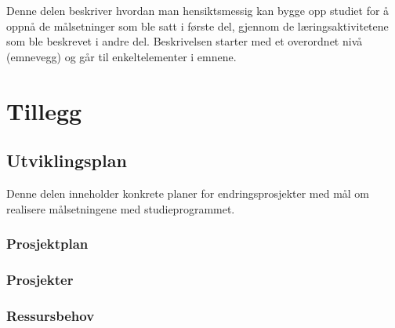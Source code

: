\documentclass[a4paper, oneside, 12pt]{memoir}
\begin{document}
Denne delen beskriver hvordan man hensiktsmessig kan bygge opp studiet for å oppnå de målsetninger som ble satt i første del, gjennom de læringsaktivitetene som ble beskrevet i andre del. Beskrivelsen starter med et overordnet nivå (emnevegg) og går til enkeltelementer i emnene.





\ifappendix
\appendix

\renewcommand{\appendixtocname}{Tillegg}
\renewcommand{\appendixpagename}{Tillegg}
\part*{Tillegg}

\chapter{Utviklingsplan}

Denne delen inneholder konkrete planer for endringsprosjekter med mål om realisere målsetningene med studieprogrammet.

\section{Prosjektplan}

\section{Prosjekter}

	


	





\section{Ressursbehov}
\end{document}
